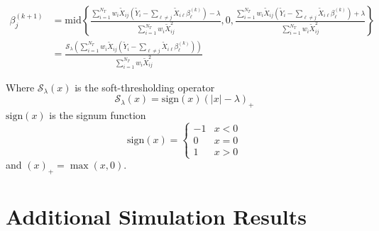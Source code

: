 \documentclass[12pt,letter]{article}\usepackage[]{graphicx}\usepackage[]{color}
\newcommand{\tm}[1]{\textrm{{#1}}}
\newcommand{\Xtilde}{\widetilde{X}}
\newcommand{\Ytilde}{\widetilde{Y}}
\begin{document}
\begin{align}
	\beta_j^{(k+1)} & = \tm{mid}\left\lbrace \frac{  \sum_{i=1}^{N_T} w_i \Xtilde_{ij}\left(  \Ytilde_i - \sum_{\ell \neq j}\Xtilde_{i\ell} \beta_\ell^{(k)} \right) - \lambda}{\sum_{i=1}^{N_T} w_i \Xtilde_{ij}^2}, 0,\frac{  \sum_{i=1}^{N_T} w_i \Xtilde_{ij}\left(  \Ytilde_i - \sum_{\ell \neq j}\Xtilde_{i\ell} \beta_\ell^{(k)} \right) + \lambda}{\sum_{i=1}^{N_T} w_i \Xtilde_{ij}^2} \right\rbrace \nonumber \\
	& = \frac{\mathcal{S}_{\lambda}\left( \sum_{i=1}^{N_T} w_i \Xtilde_{ij}\left(  \Ytilde_i - \sum_{\ell \neq j}\Xtilde_{i\ell} \beta_\ell^{(k)} \right)\right) }{\sum_{i=1}^{N_T} w_i \Xtilde_{ij}^2} \label{eq:betaUpdateSoft}
\end{align}

Where $\mathcal{S}_{\lambda}(x)$ is the soft-thresholding operator
\begin{equation*}
	\mathcal{S}_{\lambda}(x) = \tm{sign}(x)(|x| - \lambda)_+
\end{equation*}
$\textrm{sign}(x)$ is the signum function
\begin{equation*}
	\textrm{sign}(x) = \begin{cases}
		-1 & x<0\\
		0 & x= 0\\
		1 & x>0
	\end{cases}
\end{equation*}
and $(x)_+ = \max(x, 0)$.



\FloatBarrier

\newpage

\section{Additional Simulation Results} \label{ap:ggmix_sim_results}
\end{document}
